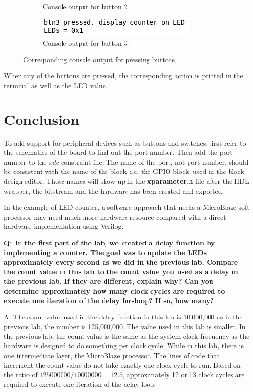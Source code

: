 \documentclass[11pt,letterpaper,titlepage]{article}
\begin{document}
\begin{figure}[ht]
\begin{subfigure}[]{0.45\textwidth}
        \caption{Console output for button 2.}
    \end{subfigure}
    \begin{subfigure}[]{0.45\textwidth}
        \includegraphics[width=\linewidth]{Btn3.png}
        \caption{Console output for button 3.}
    \end{subfigure}
    \caption{Corresponding console output for pressing buttons.}
\end{figure}

When any of the buttons are pressed, the corresponding action is printed in the terminal as well as the LED value.

\newpage

\part{Conclusion}

To add support for peripheral devices such as buttons and switches, first refer to the schematics of the board to find out the port number. Then add the port number to the \textit{xdc} constraint file. The name of the port, not port number, should be consistent with the name of the block, i.e. the GPIO block, used in the block design editor. Those names will show up in the \textbf{xparameter.h} file after the HDL wrapper, the bitstream and the hardware has been created and exported.

In the example of LED counter, a software approach that needs a MicroBlaze soft processor may need much more hardware resource compared with a direct hardware implementation using Verilog.

\textbf{Q: In the first part of the lab, we created a delay function by implementing a counter. The goal was to update the LEDs approximately every second as we did in the previous lab. Compare the count value in this lab to the count value you used as a delay in the previous lab. If they are different, explain why? Can you determine approximately how many clock cycles are required to execute one iteration of the delay for-loop? If so, how many?}

A: The count value used in the delay function in this lab is 10,000,000 as in the previous lab, the number is 125,000,000. The value used in this lab is smaller. In the previous lab, the count value is the same as the system clock frequency as the hardware is designed to do something per clock cycle. While in this lab, there is one intermediate layer, the MicroBlaze processor. The lines of code that increment the count value do not take exactly one clock cycle to run. Based on the ratio of $ 125000000/10000000 = 12.5 $, approximately 12 or 13 clock cycles are required to execute one iteration of the delay loop.
\end{document}
